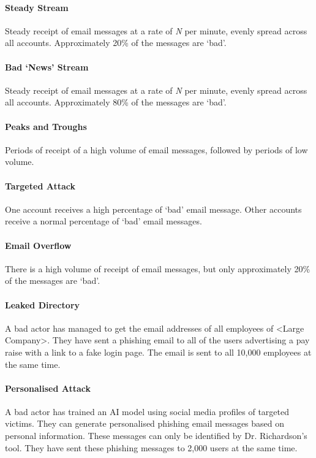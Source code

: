 \documentclass{csse4400}
\begin{document}
\paragraph{Steady Stream}
Steady receipt of email messages at a rate of \emph{N} per minute, evenly spread across all accounts. Approximately 20\% of the messages are `bad'.

\paragraph{Bad `News' Stream}
Steady receipt of email messages at a rate of \emph{N} per minute, evenly spread across all accounts. Approximately 80\% of the messages are `bad'.

\paragraph{Peaks and Troughs}
Periods of receipt of a high volume of email messages, followed by periods of low volume.

\paragraph{Targeted Attack}
One account receives a high percentage of `bad' email message. Other accounts receive a normal percentage of `bad' email messages.

\paragraph{Email Overflow}
There is a high volume of receipt of email messages, but only approximately 20\% of the messages are `bad'.

\paragraph{Leaked Directory}
A bad actor has managed to get the email addresses of all employees of <Large Company>. They have sent a phishing email to all of the users advertising a pay raise with a link to a fake login page. The email is sent to all 10,000 employees at the same time.

\paragraph{Personalised Attack}
A bad actor has trained an AI model using social media profiles of targeted victims.
They can generate personalised phishing email messages based on personal information.
These messages can only be identified by Dr. Richardson's tool.
They have sent these phishing messages to 2,000 users at the same time.
\end{document}
